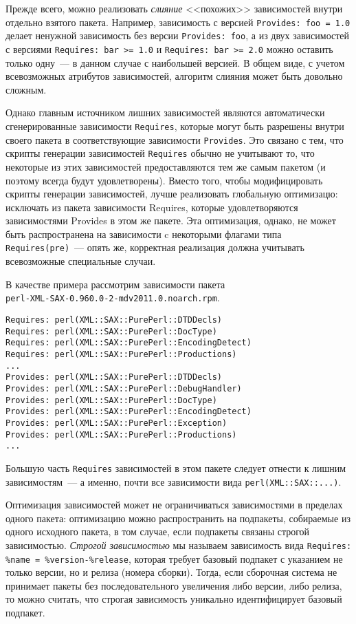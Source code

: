 \documentclass[russian,a4paper,12pt,titlepage]{article}
\begin{document}
Прежде всего, можно реализовать \textit{слияние} <<похожих>> зависимостей внутри отдельно взятого пакета.
Например, зависимость с версией \verb|Provides: foo = 1.0| делает ненужной зависимость без версии \verb|Provides: foo|,
а из двух зависимостей с версиями \verb|Requires: bar >= 1.0| и \verb|Requires: bar >= 2.0| можно оставить только
одну~--- в данном случае с наибольшей версией.  В общем виде, с учетом всевозможных атрибутов зависимостей,
алгоритм слияния может быть довольно сложным.

Однако главным источником лишних зависимостей являются автоматически сгенерированные зависимости \verb|Requires|,
которые могут быть разрешены внутри своего пакета в соответствующие зависимости \verb|Provides|.  Это
связано с тем, что скрипты генерации зависимостей \verb|Requires| обычно не учитывают то, что некоторые
из этих зависимостей предоставляются тем же самым пакетом (и поэтому всегда будут удовлетворены).
Вместо того, чтобы модифицировать скрипты генерации зависимостей, лучше реализовать глобальную оптимизацю:
исключать из пакета зависимости Requires, которые удовлетворяются зависимостями Provides в этом же пакете.
Эта оптимизация, однако, не может быть распространена на зависимости c некоторыми флагами типа \verb|Requires(pre)|~---
опять же, корректная реализация должна учитывать всевозможные специальные случаи.

В качестве примера рассмотрим зависимости пакета\\ \verb|perl-XML-SAX-0.960.0-2-mdv2011.0.noarch.rpm|.
\begin{verbatim}
Requires: perl(XML::SAX::PurePerl::DTDDecls)
Requires: perl(XML::SAX::PurePerl::DocType)
Requires: perl(XML::SAX::PurePerl::EncodingDetect)
Requires: perl(XML::SAX::PurePerl::Productions)
...
Provides: perl(XML::SAX::PurePerl::DTDDecls)
Provides: perl(XML::SAX::PurePerl::DebugHandler)
Provides: perl(XML::SAX::PurePerl::DocType)
Provides: perl(XML::SAX::PurePerl::EncodingDetect)
Provides: perl(XML::SAX::PurePerl::Exception)
Provides: perl(XML::SAX::PurePerl::Productions)
...
\end{verbatim}
Большую часть \verb|Requires| зависимостей в этом пакете следует отнести к лишним зависимостям~---
а именно, почти все зависимости вида \verb|perl(XML::SAX::...)|.

Оптимизация зависимостей может не ограничиваться зависимостями в пределах одного пакета:
оптимизацию можно распространить на подпакеты, собираемые из одного исходного пакета, в том случае,
если подпакеты связаны строгой зависимостью.  \textit{Строгой зависимостью} мы называем зависимость
вида \verb|Requires: %name = %version-%release|, которая требует базовый подпакет с указанием не
только версии, но и релиза (номера сборки).  Тогда, если сборочная система не принимает пакеты
без последовательного увеличения либо версии, либо релиза, то можно считать, что строгая зависимость
уникально идентифицирует базовый подпакет.
\end{document}
